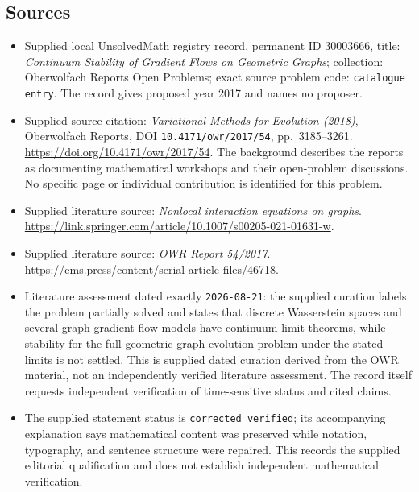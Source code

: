 \documentclass[11pt]{article}
\begin{document}
\subsection{Sources}
\begin{itemize}
\item Supplied local UnsolvedMath registry record, permanent ID \(30003666\), title: \emph{Continuum Stability of Gradient Flows on Geometric Graphs}; collection: Oberwolfach Reports Open Problems; exact source problem code: \texttt{catalogue entry}. The record gives proposed year 2017 and names no proposer.
\item Supplied source citation: \emph{Variational Methods for Evolution (2018)}, Oberwolfach Reports, DOI \texttt{10.4171/owr/2017/54}, pp.\ 3185--3261. \url{https://doi.org/10.4171/owr/2017/54}. The background describes the reports as documenting mathematical workshops and their open-problem discussions. No specific page or individual contribution is identified for this problem.
\item Supplied literature source: \emph{Nonlocal interaction equations on graphs}. \url{https://link.springer.com/article/10.1007/s00205-021-01631-w}.
\item Supplied literature source: \emph{OWR Report 54/2017}. \url{https://ems.press/content/serial-article-files/46718}.
\item Literature assessment dated exactly \texttt{2026-08-21}: the supplied curation labels the problem partially solved and states that discrete Wasserstein spaces and several graph gradient-flow models have continuum-limit theorems, while stability for the full geometric-graph evolution problem under the stated limits is not settled. This is supplied dated curation derived from the OWR material, not an independently verified literature assessment. The record itself requests independent verification of time-sensitive status and cited claims.
\item The supplied statement status is \texttt{corrected\_verified}; its accompanying explanation says mathematical content was preserved while notation, typography, and sentence structure were repaired. This records the supplied editorial qualification and does not establish independent mathematical verification.
\end{itemize}
\end{document}
